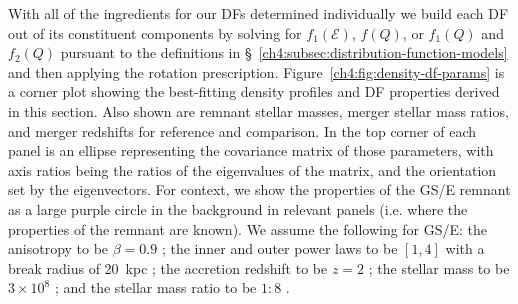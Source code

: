 With all of the ingredients for our DFs determined individually we build each DF out of its constituent components by solving for $f_{1}(\mathcal{E})$, $f(Q)$, or $f_{1}(Q)$ and $f_{2}(Q)$ pursuant to the definitions in \S~\ref{ch4:subsec:distribution-function-models} and then applying the rotation prescription. Figure~\ref{ch4:fig:density-df-params} is a corner plot showing the best-fitting density profiles and DF properties derived in this section. Also shown are remnant stellar masses, merger stellar mass ratios, and merger redshifts for reference and comparison. In the top corner of each panel is an ellipse representing the covariance matrix of those parameters, with axis ratios being the ratios of the eigenvalues of the matrix, and the orientation set by the eigenvectors. For context, we show the properties of the GS/E remnant as a large purple circle in the background in relevant panels (i.e. where the properties of the remnant are known). We assume the following for GS/E: the anisotropy to be $\beta=0.9$ \parencite{belokurov18,lancaster19}; the inner and outer power laws to be $[1,4]$ with a break radius of 20~kpc \parencite[][]{han22,lane23}; the accretion redshift to be $z=2$ \parencite[see][]{mackereth19a,montalban21}; the stellar mass to be $3\times10^{8}$ \parencite[a value typical of recent findings;][]{mackereth20,han22,lane23}; and the stellar mass ratio to be $1:8$ \parencite{lane23}. 

